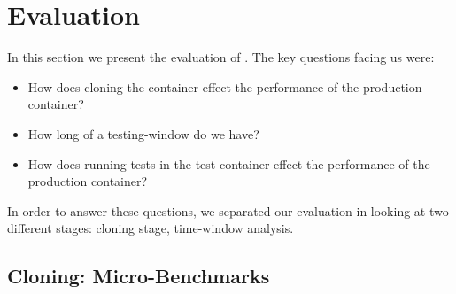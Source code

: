 \section{Evaluation}
\label{sec:evaluation}
In this section we present the evaluation of \parikshan. 
The key questions facing us were:
\begin{itemize}
     \item How does cloning the container effect the performance of the production container?
     \item How long of a testing-window do we have? 
   \item How does running tests in the test-container effect the performance of the production container?
\end{itemize}

In order to answer these questions, we separated our evaluation in looking at two different stages: cloning stage, time-window analysis.

\subsection{Cloning: Micro-Benchmarks}
\label{sec:performance}


